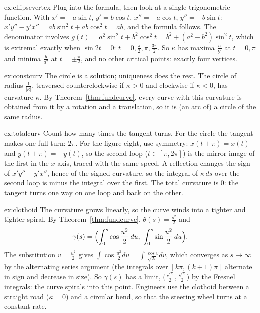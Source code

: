 \begin{solution}{ex:ellipsevertex}
\idea Plug into the formula, then look at a single trigonometric function.
\writeup With $x'=-a\sin t$, $y'=b\cos t$, $x''=-a\cos t$, $y''=-b\sin t$: $x'y''-y'x''=ab\sin^2t+ab\cos^2t=ab$, and the formula follows. The denominator involves
$g(t)=a^2\sin^2t+b^2\cos^2t=b^2+(a^2-b^2)\sin^2t$, which is extremal exactly when $\sin2t=0$: $t=0,\frac\pi2,\pi,\frac{3\pi}2$. So $\kappa$ has maxima $\frac a{b^2}$ at
$t=0,\pi$ and minima $\frac b{a^2}$ at $t=\pm\frac\pi2$, and no other critical points: exactly four vertices.
\end{solution}

\begin{solution}{ex:constcurv}
\idea The circle is a solution; uniqueness does the rest.
\writeup The circle of radius $\frac1{|\kappa|}$, traversed counterclockwise if $\kappa>0$ and clockwise if $\kappa<0$, has curvature $\kappa$. By Theorem~\ref{thm:fundcurve},
every curve with this curvature is obtained from it by a rotation and a translation, so it is (an arc of) a circle of the same radius.
\end{solution}

\begin{solution}{ex:totalcurv}
\idea Count how many times the tangent turns.
\writeup For the circle the tangent makes one full turn: $2\pi$. For the figure eight, use symmetry: $x(t+\pi)=x(t)$ and $y(t+\pi)=-y(t)$, so the second loop
($t\in[\pi,2\pi]$) is the mirror image of the first in the $x$-axis, traced with the same speed. A reflection changes the sign of $x'y''-y'x''$, hence of the signed curvature,
so the integral of $\kappa\,ds$ over the second loop is minus the integral over the first. The total curvature is $0$: the tangent turns one way on one loop and back on the other.
\end{solution}

\begin{solution}{ex:clothoid}
\idea The curvature grows linearly, so the curve winds into a tighter and tighter spiral.
\writeup By Theorem~\ref{thm:fundcurve}, $\theta(s)=\frac{s^2}2$ and
\[\gamma(s)=\Bigl(\int_0^s\cos\frac{u^2}2\,du,\ \int_0^s\sin\frac{u^2}2\,du\Bigr).\]
The substitution $v=\frac{u^2}2$ gives
$\int\cos\frac{u^2}2du=\int\frac{\cos v}{\sqrt{2v}}dv$, which converges as $s\to\infty$ by the alternating series argument (the integrals over $[k\pi,(k+1)\pi]$ alternate in sign and
decrease in size). So $\gamma(s)$ has a limit, $\bigl(\frac{\sqrt\pi}2,\frac{\sqrt\pi}2\bigr)$ by the Fresnel integrals: the curve spirals into this point. Engineers use the
clothoid between a straight road ($\kappa=0$) and a circular bend, so that the steering wheel turns at a constant rate.
\end{solution}

